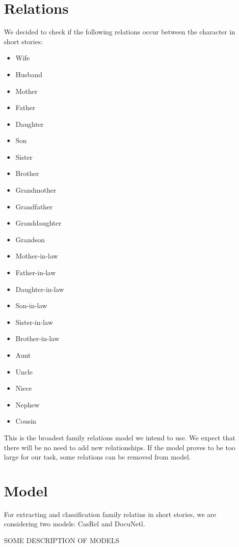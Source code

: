 \documentclass[fleqn,moreauthors,10pt]{ds_report}
\begin{document}
\section*{Relations}

We decided to check if the following relations occur between the character in short stories:
\begin{itemize}
\itemsep0em
\item Wife
\item Husband
\item Mother
\item Father
\item Daughter
\item Son
\item Sister
\item Brother
\item Grandmother
\item Grandfather
\item Granddaughter
\item Grandson
\item Mother-in-law
\item Father-in-law
\item Daughter-in-law
\item Son-in-law
\item Sister-in-law
\item Brother-in-law
\item Aunt
\item Uncle
\item Niece
\item Nephew
\item Cousin
\end{itemize}

This is the broadest family relations model we intend to use. We expect that there will be no need to add new relationships. If the model proves to be too large for our task, some relations can be removed from model.

\section*{Model}

For extracting and classification family relatins in short stories, we are considering two models: CasRel\cite{wei2020CasRel} and DocuNetl\cite{ijcai2021-551}.

SOME DESCRIPTION OF MODELS


\end{document}
